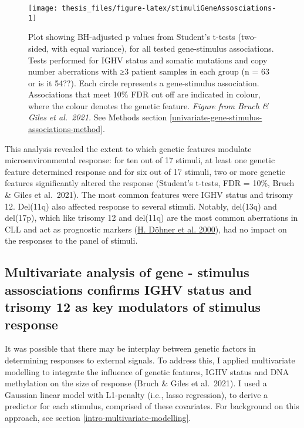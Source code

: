 \documentclass[11pt, a4paper, twosided]{book}
\begin{document}
\begin{figure}

{\centering \texttt{[image: thesis\_files/figure-latex/stimuliGeneAssosciations-1]} 

}

\caption{Plot showing BH-adjusted p values from Student's t-tests (two-sided, with equal variance), for all tested gene-stimulus associations. Tests performed for IGHV status and somatic mutations and copy number aberrations with ≥3 patient samples in each group (n = 63 or is it 54??). Each circle represents a gene-stimulus association. Associations that meet 10\% FDR cut off are indicated in colour, where the colour denotes the genetic feature. \emph{Figure from Bruch \& Giles et al.~2021.} See Methods section \ref{univariate-gene-stimulus-associations-method}.}\label{fig:stimuliGeneAssosciations}
\end{figure}
This analysis revealed the extent to which genetic features modulate microenvironmental response: for ten out of 17 stimuli, at least one genetic feature determined response and for six out of 17 stimuli, two or more genetic features significantly altered the response (Student's t-tests, FDR = 10\%, Bruch \& Giles et al.~2021). The most common features were IGHV status and trisomy 12. Del(11q) also affected response to several stimuli. Notably, del(13q) and del(17p), which like trisomy 12 and del(11q) are the most common aberrations in CLL and act as prognostic markers (\protect\hyperlink{ref-Dohner2000}{H. Döhner et al. 2000}), had no impact on the responses to the panel of stimuli.

\hypertarget{multivariate-gene-stimulus-assosciations}{%
\subsection{Multivariate analysis of gene - stimulus assosciations confirms IGHV status and trisomy 12 as key modulators of stimulus response}\label{multivariate-gene-stimulus-assosciations}}

It was possible that there may be interplay between genetic factors in determining responses to external signals. To address this, I applied multivariate modelling to integrate the influence of genetic features, IGHV status and DNA methylation on the size of response (Bruch \& Giles et al.~2021). I used a Gaussian linear model with L1-penalty (i.e., lasso regression), to derive a predictor for each stimulus, comprised of these covariates. For background on this approach, see section \ref{intro-multivariate-modelling}.
\end{document}
